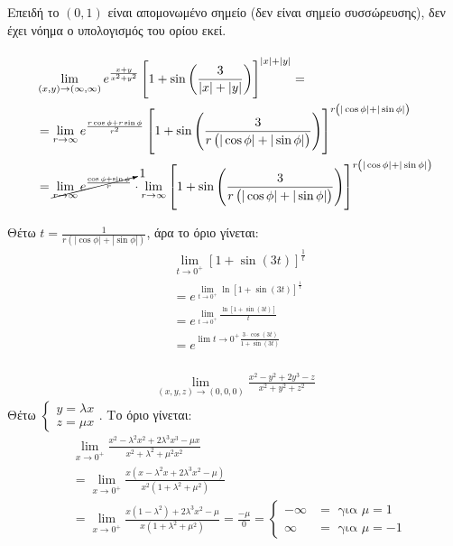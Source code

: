 \documentclass[11pt,a4paper,titlepage,draft]{article}
\begin{document}
Επειδή το \((0,1)\) είναι απομονωμένο σημείο (δεν είναι σημείο συσσώρευσης), δεν έχει νόημα ο υπολογισμός του ορίου εκεί.

\paragraph{}
\begin{align*}
 &\lim_{(x,y)\to(\infty,\infty)}
 e^{\frac{x+y}{x^2+y^2}}
 \left[
 1+ \sin \left(
 \frac{3}{|x|+|y|}
 \right)
 \right]^{|x|+|y|}
 = \\ &=
\lim_{r\to\infty}
e^{\frac{r\cos\phi+r\sin\phi}{r^2}}
\left[
 1+ \sin \left(
 \frac{3}{r\left(|\cos\phi|+|\sin\phi|\right)}
 \right)
 \right]^{r\left(|\cos\phi|+|\sin\phi|\right)}
 \\ &=
\cancelto{1}{\lim_{r\to\infty} e^{ \frac{\cos\phi+\sin\phi}{r}  }}
\cdot
\lim_{r\to\infty}
\left[
 1+ \sin \left(
 \frac{3}{r\left(|\cos\phi|+|\sin\phi|\right)}
 \right)
 \right]^{r\left(|\cos\phi|+|\sin\phi|\right)}
\end{align*}

Θέτω \(t=\frac{1}{r\left(|\cos\phi|+|\sin\phi|\right)}\), άρα το όριο γίνεται:
\begin{align*}
& \lim_{t\to0^+}
\left[
1+\sin(3t)
\right]^\frac{1}{t} \\
&=
e^{\lim_{t\to0^+} \ln \left[
1+\sin(3t)
 \right]^\frac{1}{t}}
 \\ &=
e^{\lim_{t\to0^+} \frac{\ln \left[
1+\sin(3t)\right]}{t}
 } \\
 &=
 e^{
 \lim{t\to0^+}
 \frac{3\cdot\cos(3t)}{1+\sin(3t)}
 }
\end{align*}

\paragraph{}
\begin{align*}
 \lim_{(x,y,z)\to(0,0,0)} \frac{x^2-y^2+2y^3-z}{x^2+y^2+z^2}
\end{align*}
Θέτω \(\begin{cases}y=\lambda x\\ z = \mu x\end{cases}\). Το όριο γίνεται:
\begin{align*}
& \lim_{x\to0^+}
\frac{x^2-\lambda^2x^2+2\lambda^3x^3-\mu x}{x^2+\lambda^2+\mu ^2 x^2}
\\ &=
\lim_{x\to0^+}
\frac{x(x-\lambda^2x+2\lambda^3x^2-\mu)}{x^2(1+\lambda^2+\mu^2)} \\ &=
\lim_{x\to0^+}
\frac{x(1-\lambda^2)+2\lambda^3x^2-\mu}{x(1+\lambda^2+\mu^2)} = \frac{-\mu}{0} =
\begin{cases}
-\infty &= \text{ για } \mu = 1 \\
\infty &= \text{ για } \mu = -1
\end{cases}
\end{align*}
\end{document}
